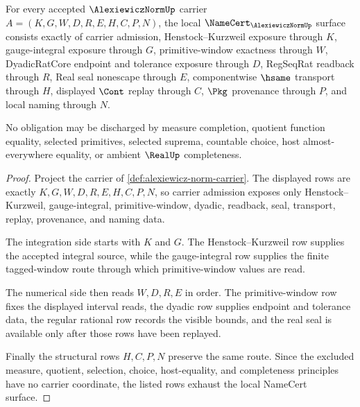 \begin{theorem}
\label{thm:alexiewicz-norm-namecert-obligations}
For every accepted $\AlexiewiczNormUp$ carrier $A=(K,G,W,D,R,E,H,C,P,N)$, the local $\NameCert_{\AlexiewiczNormUp}$ surface consists exactly of carrier admission, Henstock--Kurzweil exposure through $K$, gauge-integral exposure through $G$, primitive-window exactness through $W$, DyadicRatCore endpoint and tolerance exposure through $D$, RegSeqRat readback through $R$, Real seal nonescape through $E$, componentwise $\hsame$ transport through $H$, displayed $\Cont$ replay through $C$, $\Pkg$ provenance through $P$, and local naming through $N$.

No obligation may be discharged by measure completion, quotient function equality, selected primitives, selected suprema, countable choice, host almost-everywhere equality, or ambient $\RealUp$ completeness.
\end{theorem}
\begin{proof}
Project the carrier of \autoref{def:alexiewicz-norm-carrier}. The displayed rows are exactly $K,G,W,D,R,E,H,C,P,N$, so carrier admission exposes only Henstock--Kurzweil, gauge-integral, primitive-window, dyadic, readback, seal, transport, replay, provenance, and naming data.

The integration side starts with $K$ and $G$. The Henstock--Kurzweil row supplies the accepted integral source, while the gauge-integral row supplies the finite tagged-window route through which primitive-window values are read.

The numerical side then reads $W,D,R,E$ in order. The primitive-window row fixes the displayed interval reads, the dyadic row supplies endpoint and tolerance data, the regular rational row records the visible bounds, and the real seal is available only after those rows have been replayed.

Finally the structural rows $H,C,P,N$ preserve the same route. Since the excluded measure, quotient, selection, choice, host-equality, and completeness principles have no carrier coordinate, the listed rows exhaust the local NameCert surface.
\end{proof}

